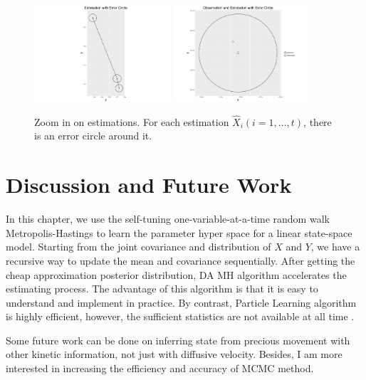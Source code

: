 \clearpage

\begin{figure}[h]
\centering
\includegraphics[width=0.45\textwidth]{Chapters/05MCMCOU/plots/realdataEstXYwithEr.pdf}
\includegraphics[width=0.45\textwidth]{Chapters/05MCMCOU/plots/realdataestwitherror.pdf}
\caption{Zoom in on estimations. For each estimation $\hat{X}_i (i=1,\dots,t)$, there is an error circle around it. }
\end{figure}


\section{Discussion and Future Work}

In this chapter, we use the self-tuning one-variable-at-a-time random walk Metropolis-Hastings to learn the parameter hyper space for a linear state-space model. Starting from the joint covariance and distribution of $X$ and $Y$, we have a recursive way to update the mean and covariance sequentially. After getting the cheap approximation posterior distribution, DA MH algorithm accelerates the estimating process. The advantage of this algorithm is that it is easy to understand and implement in practice. By contrast, Particle Learning algorithm is highly efficient, however, the sufficient statistics are not available at all time . 

Some future work can be done on inferring state from precious movement with other kinetic information, not just with diffusive  velocity. Besides, I am more interested in increasing the efficiency and accuracy of MCMC method. 

